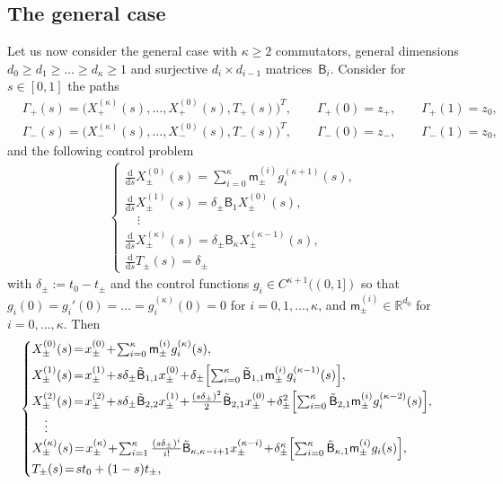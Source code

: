 \documentclass[JEP,XML,SOM,Unicode,NoFloatCountersInSection,published]{cedram}
\theoremstyle{definition}
\newcommand\R{{\mathbb R}}
\newcommand{\sB}{{\mathsf B}}
\newcommand\ds{{\frac{\mathrm d}{\mathrm ds}}}
\begin{document}
\subsection{The general case}

Let us now consider the general case with $\kappa \ge 2$
commutators, general dimensions
$d_0 \geq d_1 \geq \dots \geq d_{\kappa}\geq 1$ and surjective
$d_i \times d_{i-1}$ matrices~$\sB_i$. Consider for $s \in [0,1]$
the paths
\begin{equation*}
\begin{aligned}
& \Gamma_+(s) = \bigl(X^{(\kappa)}_+(s), \dots, X^{(0)}_+(s),
T_+(s)\bigr)^T, \qquad \Gamma_+(0) = z_+, \qquad \Gamma_+(1) =
z_0,\\
& \Gamma_-(s) = \bigl(X^{(\kappa)}_-(s), \dots, X^{(0)}_-(s),
T_-(s)\bigr)^T, \qquad \Gamma_-(0) = z_-, \qquad \Gamma_-(1) =
z_0,
\end{aligned}
\end{equation*}
and the following control problem
\begin{equation}
\label{eq:control-general}
\begin{aligned}
\begin{cases}
\ds X^{(0)}_{\pm}(s)
= \sum_{i=0} ^\kappa
\mathsf m_\pm ^{(i)} g_i^{(\kappa+1)} (s), \\[5pt]
\ds X^{(1)}_\pm(s) = \delta_\pm \sB_1 X^{(0)}_\pm(s),\\
\quad \vdots \\
\ds X^{(\kappa)}_\pm(s) = \delta_\pm \sB_\kappa X^{(\kappa-1)}_\pm(s), \\[5pt]
\ds T_\pm(s) = \delta_\pm
\end{cases}
\end{aligned}
\end{equation}
with $\delta_\pm := t_0 - t_\pm$ and the control functions
$g_i \in C^{\kappa +1}((0,1])$ so that
$g_i(0)=g_i'(0)= \dots =g_i^{(\kappa)}(0)=0$ for
$i=0,1,\dots,\kappa$, and $\mathsf m^{(i)} _\pm \in \R^{d_0}$ for
$i=0,\dots,\kappa$. Then
\begin{equation}
\label{eq:control-solved-general}
\begin{cases}
X^{(0)}_{\pm}(s) \!=\! x^{(0)} _\pm \!+\! \sum_{i=0} ^\kappa
\mathsf m_\pm ^{(i)}
g_i^{(\kappa)}(s), \\[5pt]
X^{(1)}_\pm(s) \!=\! x^{(1)} _\pm  \!+\! s \delta_\pm \tilde \sB_{1,1} x^{(0)} _\pm  \!+\!
\delta_\pm \Bigl[ \sum_{i=0} ^\kappa \tilde \sB_{1,1} \mathsf
m_\pm ^{(i)} g_i^{(\kappa-1)} (s) \Bigr],\\[5pt]
X^{(2)}_\pm(s) \!=\! x^{(2)} _\pm  \!+\! s \delta_\pm \tilde
\sB_{2,2} x^{(1)} _\pm  \!+\!
\frac{(s\delta_\pm)^2}{2} \tilde \sB_{2,1} x^{(0)} _\pm \!+\!
\delta_\pm ^2 \Bigl[ \sum_{i=0} ^\kappa \tilde \sB_{2,1} \mathsf m_\pm
^{(i)} g_i^{(\kappa-2)}(s) \Bigr],\\
\quad \vdots \\
X^{(\kappa)}_\pm(s) \!=\! x_\pm ^{(\kappa)}  \!+\! \sum_{i=1} ^\kappa \frac{(s
\delta_\pm)^i}{i!} \tilde \sB_{\kappa,\kappa-i+1} x^{(\kappa-i)} _\pm \!+\! \delta_\pm
^\kappa \Bigl[ \sum_{i=0} ^\kappa \tilde \sB_{\kappa,1} \mathsf
m_\pm ^{(i)} g_i (s) \Bigr],\\
T_\pm(s) \!=\! s t_0 + (1-s) t_\pm,
\end{cases}
\end{equation}
\end{document}
